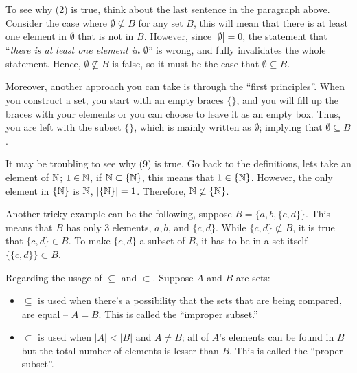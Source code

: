 \documentclass[../Latex-Setup/setup.tex]{subfiles}
\begin{document}
\indent To see why (2) is true, think about the last sentence in the paragraph above. Consider the case where $\emptyset \not\subseteq B$ for any set $B$,
this will mean that there is at least one element in $\emptyset$ that is not in $B$. However, since $|\emptyset| = 0$, the statement that
``\textit{there is at least one element in $\emptyset$}'' is wrong, and fully invalidates the whole statement.
Hence, $\emptyset \not\subseteq B$ is false, so it must be the case that $\emptyset \subseteq B$.\par

\indent Moreover, another approach you can take is through the ``first principles''. When you construct a set, you start with an empty braces $\{\}$,
and you will fill up the braces with your elements or you can choose to leave it as an empty box. Thus, you are left with the subset $\{\}$,
which is mainly written as $\emptyset$; implying that $\emptyset \subseteq B$.\par

\indent It may be troubling to see why (9) is true. Go back to the definitions, lets take an element of $\mathbb N$;
$1 \in \mathbb N$, if $\mathbb N \subset \{\mathbb N\}$, this means that $1 \in \{\mathbb N\}$. However, the only element in $\{\mathbb N\}$ is $\mathbb N$, $|\{\mathbb N\}| = 1$.
Therefore, $\mathbb N \not\subset \{\mathbb N\}$.\par

\indent Another tricky example can be the following, suppose $B = \{a,b,\{c,d\}\}$. This means that $B$ has only $3$ elements, $a,b$, and $\{c,d\}$.
While $\{c,d\} \not\subset B$, it is true that $\{c,d\} \in B$. To make $\{c,d\}$ a subset of $B$, it has to be in a set itself -- $\{\{c,d\}\} \subset B$.\par

\begin{remark}
    Regarding the usage of $\subseteq$ and $\subset$. Suppose $A$ and $B$ are sets:\par
    \begin{itemize}
        \item $\subseteq$ is used when there's a possibility that the sets that are being compared, are equal -- $A = B$. This is called the ``improper subset.''
        \item $\subset$ is used when $|A| < |B|$ and $A \neq B$; all of $A$'s elements can be found in $B$ but the total number of elements is lesser than $B$. This is called the ``proper subset''.
    \end{itemize}
\end{remark}
\end{document}
